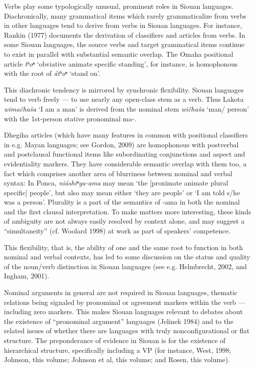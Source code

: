 \begin{refsection}
Verbs play some typologically unusual, prominent roles in Siouan languages. Diachronically, many grammatical items which rarely grammaticalize from verbs in other languages tend to derive from verbs in Siouan languages. For instance, Rankin (1977) documents the derivation of classifiers and articles from verbs. In some Siouan languages, the source verbs and target grammatical items continue to exist in parallel with substantial semantic overlap. The Omaha positional article \textit{tʰoⁿ} `obviative animate specific standing', for instance, is homophonous with the root of \textit{\'atʰoⁿ} `stand on'.


This diachronic tendency is mirrored by synchronic flexibility. Siouan languages tend to verb freely --- to use nearly any open-class stem as a verb. Thus Lakota \textit{wima\v{c}ha\v{s}a} `I am a man' is derived from the nominal stem \textit{wi\v{c}ha\v{s}a} `man/ person' with the 1st-person stative pronominal ma-.

Dhegiha articles (which have many features in common with positional classifiers in e.g. Mayan languages; see Gordon, 2009) are homophonous with postverbal and postclausal functional items like subordinating conjunctions and aspect and evidentiality markers. They have considerable semantic overlap with them too, a fact which comprises another area of blurriness between nominal and verbal syntax: In Ponca, \textit{ni\'ashiⁿga-ama} may mean `the [proximate animate plural specific] people', but also may mean either `they are people' or `I am told s/he was a person'. Plurality is a part of the semantics of -ama in both the nominal and the first clausal interpretation. To make matters more interesting, these kinds of ambiguity are not always easily resolved by context alone, and may suggest a ``simultaneity'' (cf. Woolard 1998) at work as part of speakers' competence. 


This flexibility, that is, the ability of one and the same root to function in both nominal and verbal contexts, has led to some discussion on the status and quality of the noun/verb distinction in Siouan languages (see e.g. Helmbrecht, 2002, and Ingham, 2001). 

Nominal arguments in general are not required in Siouan languages, thematic relations being signaled by pronominal or agreement markers within the verb --- including zero markers. This makes Siouan languages relevant to debates about the existence of ``pronominal argument'' languages (Jelinek 1984) and to the related issues of whether there are languages with truly nonconfigurational or flat structure. The preponderance of evidence in Siouan is for the existence of hierarchical structure, specifically including a VP (for instance, West, 1998; Johnson, this volume; Johnson et al, this volume; and Rosen, this volume).



\end{refsection}
